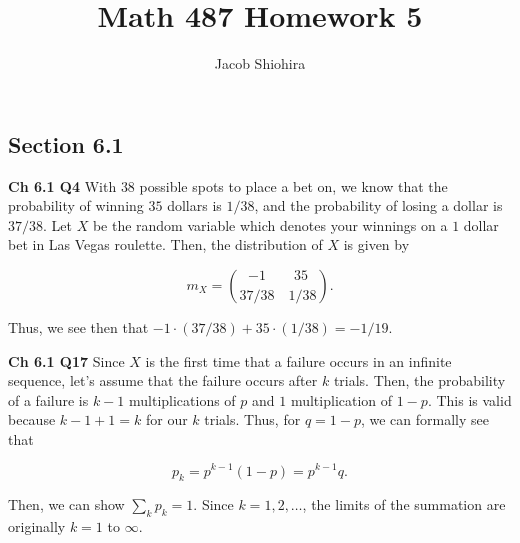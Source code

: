 \documentclass[12pt]{article}
\newcommand{\nspace}{\vspace*{.5cm}}
\newcommand{\nline}{\nspace \noindent}
\begin{document}
\title{Math 487 Homework 5}
\author{Jacob Shiohira}
\maketitle

\subsection*{Section 6.1}


\noindent
\textbf{Ch 6.1 Q4} With $38$ possible spots to place a bet on, we know that the probability of winning $35$ dollars is $1/38$, and the probability of losing a dollar is $37/38$. Let $X$ be the random variable which denotes your winnings on a $1$ dollar bet in Las Vegas roulette. Then, the distribution of $X$ is given by

\begin{equation*}
m_X = {-1 \qquad 35 \choose 37/38 \quad 1/38}.
\end{equation*}

\nline
Thus, we see then that $-1 \cdot (37/38) + 35 \cdot (1/38) = - 1/19$.



\nline
\textbf{Ch 6.1 Q17} Since $X$ is the first time that a failure occurs in an infinite sequence, let's assume that the failure occurs after $k$ trials. Then, the probability of a failure is $k-1$ multiplications of $p$ and $1$ multiplication of $1-p$. This is valid because $k-1+1=k$ for our $k$ trials. Thus, for $q=1-p$, we can formally see that

\begin{equation*}
p_k = p^{k-1} (1-p) = p^{k-1} q.
\end{equation*}

\nline
Then, we can show $\sum_{k} p_k = 1$. Since $k=1,2, \ldots$, the limits of the summation are originally $k=1$ to $\infty$.
\end{document}
